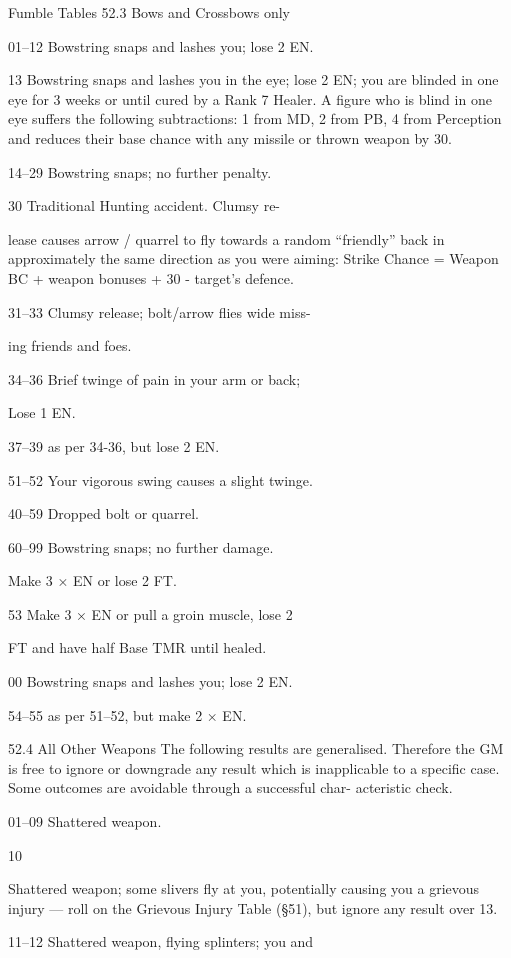 \begin{Chapter}{Fumble Tables}
52.3 Bows and Crossbows only 

01–12  Bowstring snaps and lashes you; lose 2 EN. 

13   Bowstring snaps and lashes you in the eye; 
lose 2 EN; you are blinded in one eye for 3 
weeks or until cured by a Rank 7 Healer. A 
figure who is blind in one eye suffers the 
following subtractions: 1 from MD, 2 from 
PB, 4 from Perception and reduces their 
base chance with any missile or thrown 
weapon by 30. 

14–29  Bowstring snaps; no further penalty. 

30   Traditional Hunting accident. Clumsy re-

lease causes arrow / quarrel to fly towards a 
random “friendly” back in approximately 
the same direction as you were aiming: 
Strike Chance = Weapon BC + weapon 
bonuses + 30 - target’s defence. 

31–33  Clumsy release; bolt/arrow flies wide miss-

ing friends and foes. 

34–36  Brief twinge of pain in your arm or back; 

Lose 1 EN. 

37–39  as per 34-36, but lose 2 EN. 

51–52  Your vigorous swing causes a slight twinge. 

40–59  Dropped bolt or quarrel. 

60–99  Bowstring snaps; no further damage. 

Make 3 × EN or lose 2 FT. 

53   Make 3 × EN or pull a groin muscle, lose 2 

FT and have half Base TMR until healed. 

00   Bowstring snaps and lashes you; lose 2 EN. 

54–55  as per 51–52, but make 2 × EN. 

52.4 All Other Weapons 
The  following  results  are  generalised.  Therefore 
the  GM  is  free  to  ignore  or  downgrade  any  result 
which  is  inapplicable  to  a  specific  case.  Some 
outcomes are avoidable through a successful char-
acteristic check. 

01–09  Shattered weapon. 

10  

Shattered weapon; some slivers fly at you, 
potentially causing you a grievous injury — 
roll on the Grievous Injury Table (§51), but 
ignore any result over 13. 

11–12  Shattered weapon, flying splinters; you and 


\end{Chapter}
